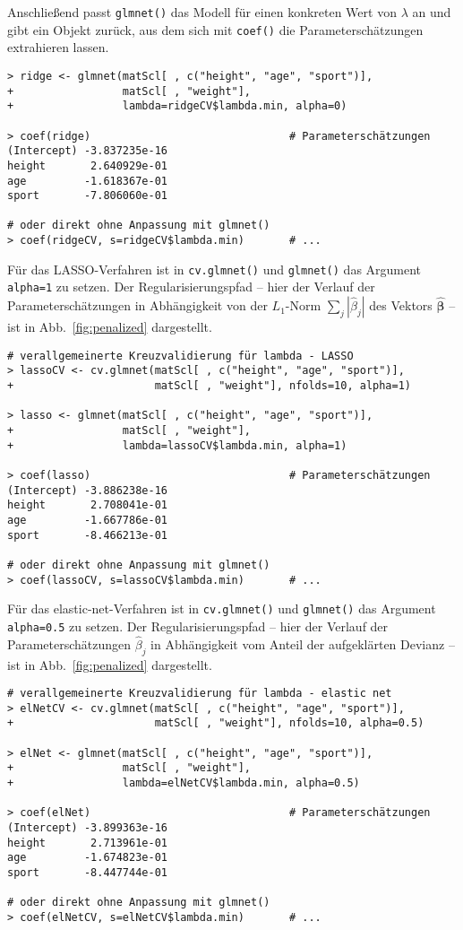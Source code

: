 Anschließend passt \lstinline!glmnet()! das Modell für einen konkreten Wert von $\lambda$ an und gibt ein Objekt zurück, aus dem sich mit \lstinline!coef()! die Parameterschätzungen extrahieren lassen.
\begin{lstlisting}
> ridge <- glmnet(matScl[ , c("height", "age", "sport")],
+                 matScl[ , "weight"],
+                 lambda=ridgeCV$lambda.min, alpha=0)

> coef(ridge)                               # Parameterschätzungen
(Intercept) -3.837235e-16
height       2.640929e-01
age         -1.618367e-01
sport       -7.806060e-01

# oder direkt ohne Anpassung mit glmnet()
> coef(ridgeCV, s=ridgeCV$lambda.min)       # ...
\end{lstlisting}

Für das LASSO-Verfahren ist in \lstinline!cv.glmnet()! und \lstinline!glmnet()! das Argument \lstinline!alpha=1! zu setzen. Der Regularisierungspfad -- hier der Verlauf der Parameterschätzungen in Abhängigkeit von der $L_{1}$-Norm $\sum_{j} |\hat{\beta}_{j}|$ des Vektors $\hat{\bm{\beta}}$ -- ist in Abb.\ \ref{fig:penalized} dargestellt.
\begin{lstlisting}
# verallgemeinerte Kreuzvalidierung für lambda - LASSO
> lassoCV <- cv.glmnet(matScl[ , c("height", "age", "sport")],
+                      matScl[ , "weight"], nfolds=10, alpha=1)

> lasso <- glmnet(matScl[ , c("height", "age", "sport")],
+                 matScl[ , "weight"],
+                 lambda=lassoCV$lambda.min, alpha=1)

> coef(lasso)                               # Parameterschätzungen
(Intercept) -3.886238e-16
height       2.708041e-01
age         -1.667786e-01
sport       -8.466213e-01

# oder direkt ohne Anpassung mit glmnet()
> coef(lassoCV, s=lassoCV$lambda.min)       # ...
\end{lstlisting}

Für das elastic-net-Verfahren ist in \lstinline!cv.glmnet()! und \lstinline!glmnet()! das Argument \lstinline!alpha=0.5! zu setzen. Der Regularisierungspfad -- hier der Verlauf der Parameterschätzungen $\hat{\beta}_{j}$ in Abhängigkeit vom Anteil der aufgeklärten Devianz -- ist in Abb.\ \ref{fig:penalized} dargestellt.
\begin{lstlisting}
# verallgemeinerte Kreuzvalidierung für lambda - elastic net
> elNetCV <- cv.glmnet(matScl[ , c("height", "age", "sport")],
+                      matScl[ , "weight"], nfolds=10, alpha=0.5)

> elNet <- glmnet(matScl[ , c("height", "age", "sport")],
+                 matScl[ , "weight"],
+                 lambda=elNetCV$lambda.min, alpha=0.5)

> coef(elNet)                               # Parameterschätzungen
(Intercept) -3.899363e-16
height       2.713961e-01
age         -1.674823e-01
sport       -8.447744e-01

# oder direkt ohne Anpassung mit glmnet()
> coef(elNetCV, s=elNetCV$lambda.min)       # ...
\end{lstlisting}

